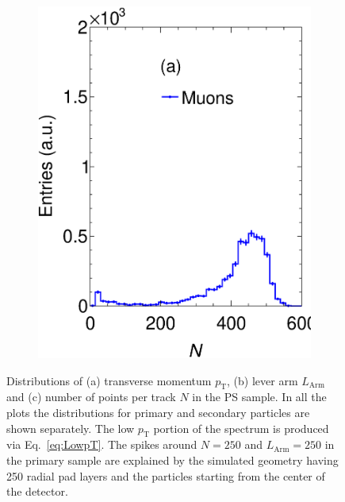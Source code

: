 \begin{figure}[t]
\begin{subfigure}[b]{0.32\textwidth}
         \includegraphics[width=\textwidth]{figures/ch5-KF_NDGAr/FullSample/PGun/Props/NTallpgun.eps}
         \caption{}
         \label{fig:NTPC_PGun}
     \end{subfigure}
        \caption{Distributions of (a) transverse momentum $p_{\textrm{T}}$,  (b) lever arm $L_{\textrm{Arm}}$ and (c) number of points per track $N$ in the PS sample. In all the plots the distributions for primary and secondary particles are shown separately. The low $p_{\textrm{T}}$ portion of the spectrum is produced via Eq.~\ref{eq:LowpT}. The spikes around $N=250$ and $L_{\textrm{Arm}}=250$ in the primary sample are explained by the simulated geometry having 250 radial pad layers and the particles starting from the center of the detector. } \label{fig:TPCProperties_PGun}
\end{figure}

